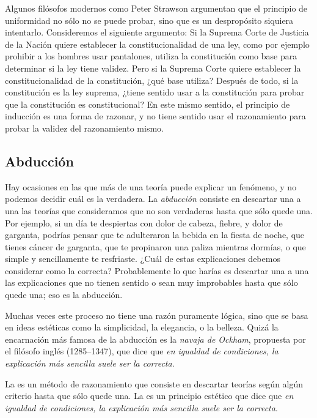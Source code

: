 Algunos filósofos modernos como Peter Strawson argumentan que el principio de
uniformidad no sólo no se puede probar, sino que es un despropósito siquiera
intentarlo\cite{Strawson2012}.
Consideremos el siguiente argumento:
Si la Suprema Corte de Justicia de la Nación quiere establecer la
constitucionalidad de una ley, como por ejemplo prohibir a los hombres usar
pantalones, utiliza la constitución como base para determinar si la ley tiene
validez.
Pero si la Suprema Corte quiere establecer la constitucionalidad de la
constitución, ¿qué base utiliza?
Después de todo, si la constitución es la ley suprema, ¿tiene sentido usar a la
constitución para probar que la constitución es constitucional?
En este mismo sentido, el principio de inducción es una forma de razonar, y no
tiene sentido usar el razonamiento para probar la validez del razonamiento
mismo.

\subsection*{Abducción}
\label{sub:abduccion}
Hay ocasiones en las que más de una teoría puede explicar un fenómeno, y no
podemos decidir cuál es la verdadera.
La  \emph{abducción} consiste en descartar una a una las teorías que
consideramos que no son verdaderas hasta que sólo quede una.
Por ejemplo, si un día te despiertas con dolor de cabeza, fiebre, y dolor de
garganta, podrías pensar que te adulteraron la bebida en la fiesta de noche, que
tienes cáncer de garganta, que te propinaron una paliza mientras dormías, o que
simple y sencillamente te resfriaste.
¿Cuál de estas explicaciones debemos considerar como la correcta?
Probablemente lo que harías es descartar una a una las explicaciones que no
tienen sentido o sean muy improbables hasta que sólo quede una; eso es la
abducción.

Muchas veces este proceso no tiene una razón puramente lógica, sino que se basa
en ideas estéticas como la simplicidad, la elegancia, o la belleza.
Quizá la encarnación más famosa de la abducción es la \emph{navaja de Ockham},
propuesta por el filósofo inglés  (1285--1347), que dice que \emph{en igualdad de condiciones, la
    explicación más sencilla suele ser la correcta}.


\begin{remember}
    \label{rem:abduccion}
    La  es un método de razonamiento que consiste en
    descartar teorías según algún criterio hasta que sólo quede una.
    La  es un principio estético que dice que
    \emph{en igualdad de condiciones, la explicación más sencilla suele ser la
        correcta}.
\end{remember}

